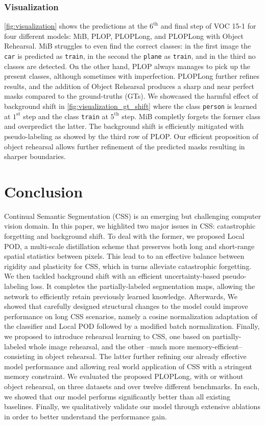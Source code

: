 \subsubsection{Visualization}

\autoref{fig:visualization} shows the predictions at the $6^\text{th}$ and final step of VOC 15-1
for four different models: MiB, PLOP, PLOPLong, and PLOPLong with Object Rehearsal. MiB struggles to
even find the correct classes: in the first image the \texttt{car} is predicted as \texttt{train},
in the second the \texttt{plane} as \texttt{train}, and in the third no classes are detected. On the
other hand, PLOP always manages to pick up the present classes, although sometimes with
imperfection. PLOPLong further refines results, and the addition of Object Rehearsal produces a
sharp and near perfect masks compared to the ground-truths (GTs). We showcased the harmful effect of
background shift in \autoref{fig:visualization_gt_shift} where the class \texttt{person} is learned
at $1^\text{st}$ step and the class \texttt{train} at $5^\text{th}$ step. MiB completly forgets the
former class and overpredict the latter. The background shift is efficiently mitigated with
pseudo-labeling as showed by the third row of PLOP. Our efficient proposition of object rehearsal
allows further refinement of the predicted masks resulting in sharper boundaries.

\section{Conclusion}

Continual Semantic Segmentation (CSS) is an emerging but challenging computer vision domain. In this
paper, we highlited two major issues in CSS: catastrophic forgetting and background shift. To deal
with the former, we proposed Local POD, a multi-scale distillation scheme that preserves both long
and short-range spatial statistics between pixels. This lead to to an effective balance between
rigidity and plasticity for CSS, which in turns alleviate catastrophic forgetting. We then tackled
background shift with an efficient uncertainty-based pseudo-labeling loss. It completes the
partially-labeled segmentation maps, allowing the network to efficiently retain previously learned
knowledge. Afterwards, We showed that carefully designed structural changes to the model could
improve performance on long CSS scenarios, namely a cosine normalization adaptation of the
classifier and Local POD followed by a modified batch normalization. Finally, we proposed to
introduce rehearsal learning to CSS, one based on partially-labeled whole image rehearsal, and the
other --much more memory-efficient-- consisting in object rehearsal. The latter further refining our
already effective model performance and allowing real world application of CSS with a stringent
memory constraint. We evaluated the proposed PLOPLong, with or without object rehearsal, on three
datasets and over twelve different benchmarks. In each, we showed that our model performs
significantly better than all existing baselines. Finally, we qualitatively validate our model
through extensive ablations in order to better understand the performance gain.
